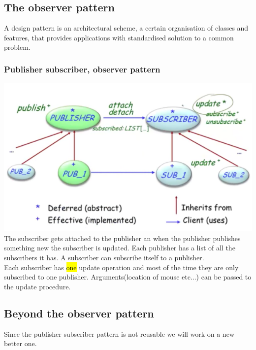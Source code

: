 \documentclass[11pt]{article}
\newcommand\back[1][-3cm]{\hspace*{#1}}
\begin{document}
\subsection{The observer pattern}
A design pattern is an architectural scheme, a certain organisation of classes and features, that provides applications with standardised solution to a common problem.\\
\subsubsection{Publisher subscriber, observer pattern}
\back\includegraphics{pub}\\
The subscriber gets attached to the publisher an when the publisher publishes something new the subscriber is updated. Each publisher has a list of all the subscribers it has. A subscriber can subscribe itself to a publisher.\\Each subscriber has \hl{one} update operation and most of the time they are only subscribed to one publisher. Arguments(location of mouse etc...) can be passed to the update procedure.
\subsection{Beyond the observer pattern}
Since the publisher subscriber pattern is not reusable we will work on a new better one.
\end{document}
